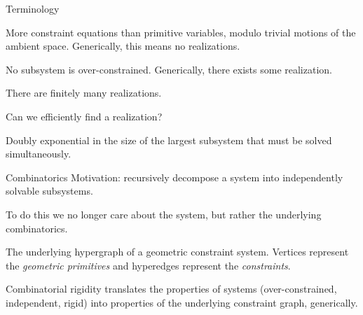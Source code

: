 \documentclass{mySlides}
\newcommand{\n}{\vspace{1em}}
\newcommand{\term}[1]{\textit{#1}}
\begin{document}
\begin{frame}{Terminology}
    \begin{definition}
        More constraint equations than primitive variables, modulo trivial motions of the ambient space. Generically, this means no realizations.
    \end{definition}

    \pause
    \begin{definition}
        No subsystem is over-constrained. Generically,  there exists some realization.
    \end{definition}

    \pause
    \begin{definition}
        There are finitely many realizations.
    \end{definition}

    \pause
    Can we efficiently find a realization?

    Doubly exponential in the size of the largest subsystem that must be solved simultaneously.


\end{frame}

\begin{frame}{Combinatorics}
    Motivation: recursively decompose a system into independently solvable subsystems.

    \pause
    \n

    To do this we no longer care about the system, but rather the underlying combinatorics.

    \begin{definition}
        The underlying hypergraph of a geometric constraint system. Vertices represent the \term{geometric primitives} and hyperedges represent the \term{constraints}.
    \end{definition}

    \pause
    Combinatorial rigidity translates the properties of systems (over-constrained, independent, rigid) into properties of the underlying constraint graph, generically.
\end{frame}
\end{document}
